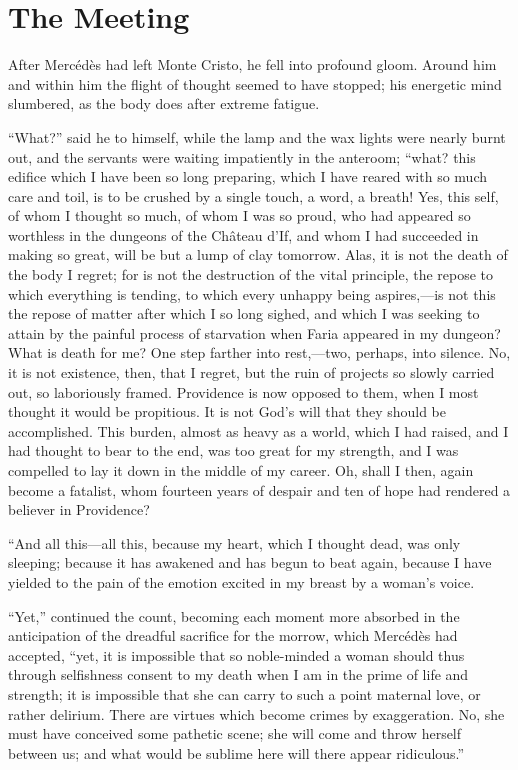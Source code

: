 \chapter{The Meeting}

After Mercédès had left Monte Cristo, he fell into profound gloom.
Around him and within him the flight of thought seemed to have stopped;
his energetic mind slumbered, as the body does after extreme fatigue.

“What?” said he to himself, while the lamp and the wax lights were
nearly burnt out, and the servants were waiting impatiently in the
anteroom; “what? this edifice which I have been so long preparing,
which I have reared with so much care and toil, is to be crushed by a
single touch, a word, a breath! Yes, this self, of whom I thought so
much, of whom I was so proud, who had appeared so worthless in the
dungeons of the Château d’If, and whom I had succeeded in making so
great, will be but a lump of clay tomorrow. Alas, it is not the death
of the body I regret; for is not the destruction of the vital
principle, the repose to which everything is tending, to which every
unhappy being aspires,—is not this the repose of matter after which I
so long sighed, and which I was seeking to attain by the painful
process of starvation when Faria appeared in my dungeon? What is death
for me? One step farther into rest,—two, perhaps, into silence. No, it
is not existence, then, that I regret, but the ruin of projects so
slowly carried out, so laboriously framed. Providence is now opposed to
them, when I most thought it would be propitious. It is not God’s will
that they should be accomplished. This burden, almost as heavy as a
world, which I had raised, and I had thought to bear to the end, was
too great for my strength, and I was compelled to lay it down in the
middle of my career. Oh, shall I then, again become a fatalist, whom
fourteen years of despair and ten of hope had rendered a believer in
Providence?

“And all this—all this, because my heart, which I thought dead, was
only sleeping; because it has awakened and has begun to beat again,
because I have yielded to the pain of the emotion excited in my breast
by a woman’s voice.

“Yet,” continued the count, becoming each moment more absorbed in the
anticipation of the dreadful sacrifice for the morrow, which Mercédès
had accepted, “yet, it is impossible that so noble-minded a woman
should thus through selfishness consent to my death when I am in the
prime of life and strength; it is impossible that she can carry to such
a point maternal love, or rather delirium. There are virtues which
become crimes by exaggeration. No, she must have conceived some
pathetic scene; she will come and throw herself between us; and what
would be sublime here will there appear ridiculous.”

